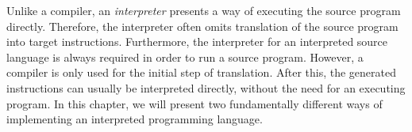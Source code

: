 Unlike a compiler, an \emph{interpreter} presents a way of executing the source program directly.
Therefore, the interpreter often omits translation of the source program into target instructions.
Furthermore, the interpreter for an interpreted source language is always required in order to run a source program.
However, a compiler is only used for the initial step of translation.
After this, the generated instructions can usually be interpreted directly, without the need for an executing program.
In this chapter, we will present two fundamentally different ways of implementing an interpreted programming language.
